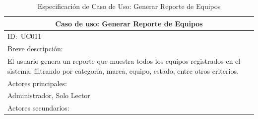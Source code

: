 \documentclass[stu, 12pt, letterpaper, donotrepeattitle, floatsintext, natbib]{apa7}
\begin{document}
\begin{longtable}{@{} p{16.5cm} @{}}
    \caption{Especificación de Caso de Uso: Generar Reporte de Equipos}\label{tab:UC011}                                                                                                                                                                                       \\ \toprule
    \multicolumn{1}{c}{Caso de uso: Generar Reporte de Equipos}                                                                                                                                                                                                                \\ \midrule
    ID:~UC011                                                                                                                                                                                                                                                                  \\ \midrule
    Breve descripción:                                                                                                                                                                                                                                                         \\
    El usuario genera un reporte que muestra todos los equipos registrados en el sistema, filtrando por categoría, marca, equipo, estado, entre otros criterios.                                                                                                               \\ \midrule
    Actores principales:                                                                                                                                                                                                                                                       \\
    Administrador, Solo Lector                                                                                                                                                                                                                                                 \\ \midrule
    Actores secundarios:                                                                                                                                                                                                                                                       \\

\end{longtable}
\end{document}
